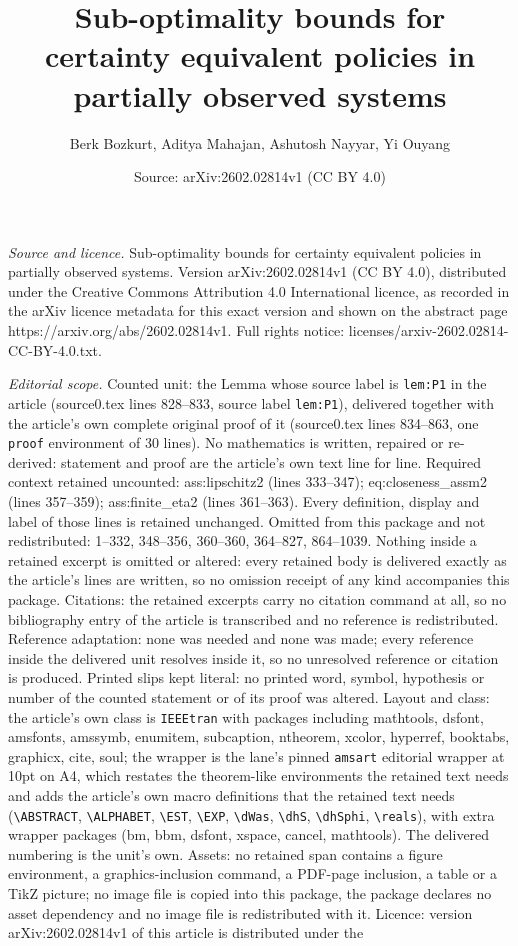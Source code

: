 \documentclass[10pt,a4paper]{amsart}
\title[Sub-optimality bounds for certainty equivalent policies in p]{Sub-optimality bounds for certainty equivalent policies in partially observed systems}
\author{Berk Bozkurt, Aditya Mahajan, Ashutosh Nayyar, Yi Ouyang}
\date{Source: arXiv:2602.02814v1 (CC BY 4.0)}
\begin{document}
\maketitle

\noindent\emph{Source and licence.} Sub-optimality bounds for certainty equivalent policies in partially observed systems. Version arXiv:2602.02814v1 (CC BY 4.0), distributed under the Creative Commons Attribution 4.0 International licence, as recorded in the arXiv licence metadata for this exact version and shown on the abstract page https://arxiv.org/abs/2602.02814v1. Full rights notice: licenses/arxiv-2602.02814-CC-BY-4.0.txt.\par\smallskip

\noindent\textit{Editorial scope.} Counted unit: the Lemma whose source label is \texttt{lem:P1} in the article (source0.tex lines 828--833, source label \texttt{lem:P1}), delivered together with the article's own complete original proof of it (source0.tex lines 834--863, one \texttt{proof} environment of 30 lines). No mathematics is written, repaired or re-derived: statement and proof are the article's own text line for line. Required context retained uncounted: ass:lipschitz2 (lines 333--347); eq:closeness\_assm2 (lines 357--359); ass:finite\_eta2 (lines 361--363). Every definition, display and label of those lines is retained unchanged. Omitted from this package and not redistributed: 1--332, 348--356, 360--360, 364--827, 864--1039. Nothing inside a retained excerpt is omitted or altered: every retained body is delivered exactly as the article's lines are written, so no omission receipt of any kind accompanies this package. Citations: the retained excerpts carry no citation command at all, so no bibliography entry of the article is transcribed and no reference is redistributed. Reference adaptation: none was needed and none was made; every reference inside the delivered unit resolves inside it, so no unresolved reference or citation is produced. Printed slips kept literal: no printed word, symbol, hypothesis or number of the counted statement or of its proof was altered. Layout and class: the article's own class is \texttt{IEEEtran} with packages including mathtools, dsfont, amsfonts, amssymb, enumitem, subcaption, ntheorem, xcolor, hyperref, booktabs, graphicx, cite, soul; the wrapper is the lane's pinned \texttt{amsart} editorial wrapper at 10pt on A4, which restates the theorem-like environments the retained text needs and adds the article's own macro definitions that the retained text needs (\texttt{\textbackslash ABSTRACT}, \texttt{\textbackslash ALPHABET}, \texttt{\textbackslash EST}, \texttt{\textbackslash EXP}, \texttt{\textbackslash dWas}, \texttt{\textbackslash dhS}, \texttt{\textbackslash dhSphi}, \texttt{\textbackslash reals}), with extra wrapper packages (bm, bbm, dsfont, xspace, cancel, mathtools). The delivered numbering is the unit's own. Assets: no retained span contains a figure environment, a graphics-inclusion command, a PDF-page inclusion, a table or a TikZ picture; no image file is copied into this package, the package declares no asset dependency and no image file is redistributed with it. Licence: version arXiv:2602.02814v1 of this article is distributed under the 
\end{document}
